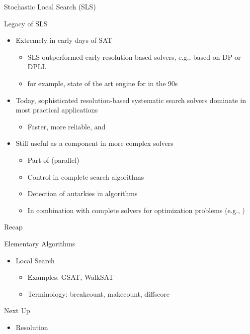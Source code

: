 \documentclass[t]{sdqbeamer}
\begin{document}
\begin{frame}{Stochastic Local Search (SLS)}
	\begin{block}{Legacy of SLS}
		\begin{itemize}\setlength{\itemsep}{0.8em}
			\item<1-> Extremely  in early days of SAT
			\begin{itemize}
				\item SLS outperformed early resolution-based solvers, e.g., based on DP or DPLL
				\item for example, state of the art engine for  in the 90s
			\end{itemize}
			\item<2-> Today, sophisticated resolution-based systematic search solvers dominate in most practical applications
			\begin{itemize}
				\item Faster, more reliable, and 
			\end{itemize}
			\item<3-> Still useful as a component in more complex solvers
			\begin{itemize}
				\item Part of (parallel) 
				\item Control  in complete search algorithms
				\item Detection of autarkies in  algorithms
				\item In combination with complete solvers for optimization problems (e.g., )
			\end{itemize}
		\end{itemize}
	\end{block}
\end{frame}

\begin{frame}{Recap}
	\begin{block}{Elementary Algorithms}
		\begin{itemize}\setlength{\itemsep}{1em}
			\item Local Search
			\begin{itemize}\setlength{\itemsep}{1ex}
				\item Examples: GSAT, WalkSAT
				\item Terminology: breakcount, makecount, diffscore
			\end{itemize}
		\end{itemize}
	\end{block}
	\pause
	\begin{block}{Next Up}
		\begin{itemize}\setlength{\itemsep}{1em}
			\item Resolution
		\end{itemize}
	\end{block}
\end{frame}
\end{document}
